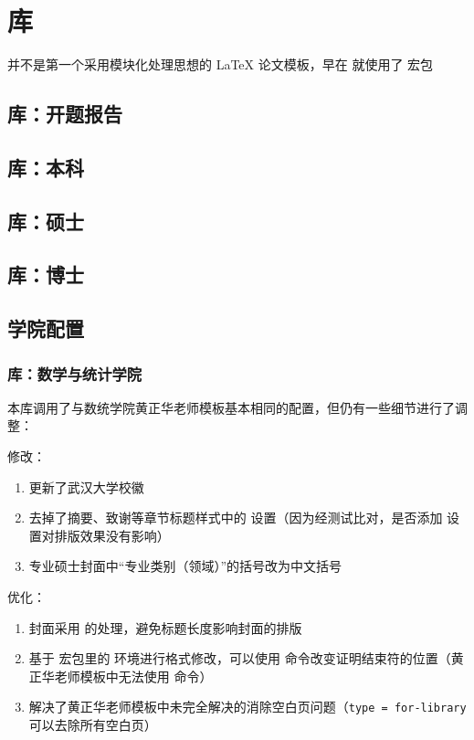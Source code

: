
\chapter{库}

 并不是第一个采用模块化处理思想的 \LaTeX{} 论文模板，早在  就使用了  宏包

\section{ 库：开题报告}


\section{ 库：本科}


\section{ 库：硕士}


\section{ 库：博士}


\section{学院配置}

\subsection{ 库：数学与统计学院}

本库调用了与数统学院黄正华老师模板基本相同的配置，但仍有一些细节进行了调整：

修改：
\begin{enumerate}
  \item 更新了武汉大学校徽\cite{whulogo}
  \item 去掉了摘要、致谢等章节标题样式中的  设置（因为经测试比对，是否添加  设置对排版效果没有影响）
  \item 专业硕士封面中“专业类别（领域）”的括号改为中文括号
\end{enumerate}

优化：
\begin{enumerate}
  \item 封面采用  的处理，避免标题长度影响封面的排版
  \item 基于  宏包里的  环境进行格式修改，可以使用  命令改变证明结束符的位置（黄正华老师模板中无法使用  命令）
  \item 解决了黄正华老师模板中未完全解决的消除空白页问题（\verb|type = for-library| 可以去除所有空白页）
\end{enumerate}


